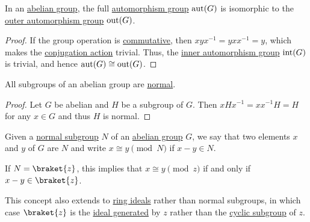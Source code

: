 \begin{proposition}\label{thm:abelian_outer_automorphism_group}
  In an \hyperref[def:abelian_group]{abelian group}, the full \hyperref[def:automorphism_group]{automorphism group} \( \operatorname{aut}(G) \) is isomorphic to the \hyperref[def:inner_and_outer_automorphisms]{outer automorphism group} \( \operatorname{out}(G) \).
\end{proposition}
\begin{proof}
  If the group operation is \hyperref[def:magma/commutative]{commutative}, then \( xyx^{-1} = yxx^{-1} = y \), which makes the \hyperref[def:inner_and_outer_automorphisms]{conjugation action} trivial. Thus, the \hyperref[def:inner_and_outer_automorphisms]{inner automorphism group} \( \operatorname{int}(G) \) is trivial, and hence \( \operatorname{aut}(G) \cong \operatorname{out}(G) \).
\end{proof}

\begin{proposition}\label{thm:abelian_normal_subgroups}
  All subgroups of an abelian group are \hyperref[thm:normal_subgroup_equivalences]{normal}.
\end{proposition}
\begin{proof}
  Let \( G \) be abelian and \( H \) be a subgroup of \( G \). Then \( x H x^{-1} = xx^{-1} H = H \) for any \( x \in G \) and thus \( H \) is normal.
\end{proof}

\begin{definition}\label{def:congruence_modulo_normal_subgroup}
  Given a \hyperref[thm:normal_subgroup_equivalences]{normal subgroup} \( N \) of an \hyperref[def:abelian_group]{abelian group} \( G \), we say that two elements \( x \) and \( y \) of \( G \) are  \( N \) and write \( x \cong y \pmod N \) if \( x - y \in N \).

  If \( N = \braket{ z } \), this implies that \( x \cong y \pmod z \) if and only if \( x - y \in \braket{ z } \).

  This concept also extends to \hyperref[def:semiring_ideal]{ring ideals} rather than normal subgroups, in which case \( \braket{ z } \) is the \hyperref[def:semiring_ideal/generated]{ideal generated} by \( z \) rather than the \hyperref[def:cyclic_group]{cyclic subgroup} of \( z \).
\end{definition}

